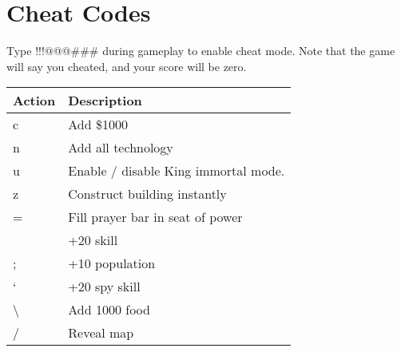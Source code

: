 \section{Cheat Codes}

Type !!!@@@\#\#\# during gameplay to enable cheat mode. Note that the game will say you cheated, and your score will be zero.

\begin{tabular}{ | l | p{6cm} |}
	\hline	 
	Action	& Description \\ \hline
c	& Add \$1000 \\ \hline
n	& Add all technology \\ \hline
u	& Enable / disable King immortal mode. \\ \hline
z	& Construct building instantly \\ \hline
=	& Fill prayer bar in seat of power \\ \hline
[	& +20 combat skill \\ \hline
]	& +20 skill \\ \hline
;	& +10 population \\ \hline
‘	& +20 spy skill \\ \hline
\textbackslash & Add 1000 food \\ \hline
/	& Reveal map \\ \hline
	\hline
\end{tabular}

